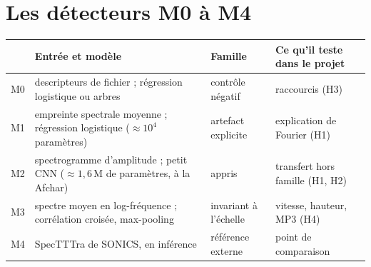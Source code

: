 \documentclass[10pt,a4paper]{article}
\begin{document}
\section{Les détecteurs M0 à M4}\label{sec:detect}

\begin{center}\footnotesize
\begin{tabularx}{\textwidth}{@{}L{1.0cm}L{4.2cm}L{3.6cm}X@{}}
\toprule
 & \textbf{Entrée et modèle} & \textbf{Famille} & \textbf{Ce qu'il teste dans le projet}\\
\midrule
M0 & descripteurs de fichier ; régression logistique ou arbres & contrôle négatif & raccourcis (H3)\\
M1 & empreinte spectrale moyenne ; régression logistique ($\ensuremath{\approx}10^4$ paramètres) & artefact explicite & explication de Fourier (H1)\\
M2 & spectrogramme d'amplitude ; petit CNN ($\ensuremath{\approx}1{,}6$\,M de paramètres, à la Afchar) & appris & transfert hors famille (H1, H2)\\
M3 & spectre moyen en log-fréquence ; corrélation croisée, max-pooling & invariant à l'échelle & vitesse, hauteur, MP3 (H4)\\
M4 & SpecTTTra de SONICS, en inférence & référence externe & point de comparaison\\
\bottomrule
\end{tabularx}
\end{center}
\end{document}
